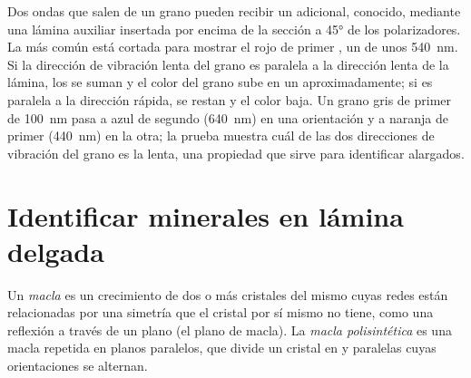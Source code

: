 Dos ondas que salen de un grano pueden recibir un  adicional, conocido, mediante una lámina auxiliar insertada por
encima de la sección a \ang{45} de los polarizadores. La más común está cortada para mostrar el rojo de primer , un
 de unos \qty{540}{nm}. Si la dirección de vibración lenta del grano es paralela a la dirección lenta de la lámina,
los  se suman y el color del grano sube en un  aproximadamente; si es paralela a la dirección rápida, se restan
y el color baja. Un grano gris de primer  de \qty{100}{nm} pasa a azul de segundo  (\qty{640}{nm}) en una
orientación y a naranja de primer  (\qty{440}{nm}) en la otra; la prueba muestra cuál de las dos direcciones de
vibración del grano es la lenta, una propiedad que sirve para identificar  alargados.

\section{Identificar minerales en lámina delgada}

\begin{definition}\label{def:b1:optical-mineralogy:twin}
Un \emph{macla} es un crecimiento de dos o más cristales del mismo  cuyas redes están
relacionadas por una simetría que el cristal por sí mismo no tiene, como una reflexión a través de un plano (el plano de
macla). La \emph{macla polisintética} es una macla repetida en planos paralelos, que divide un
cristal en  y paralelas cuyas orientaciones se alternan.
\end{definition}

